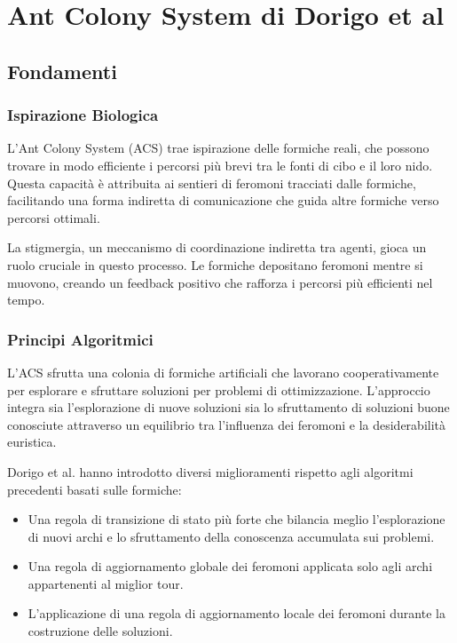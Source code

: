 
%

\chapter{Ant Colony System di Dorigo et al}\label{chapt:5}



\section{Fondamenti}

\subsection{Ispirazione Biologica}
L'Ant Colony System (\Gls{ACS}) trae ispirazione delle formiche reali, che possono trovare in modo efficiente i percorsi più brevi tra le fonti di cibo e il loro nido. Questa capacità è attribuita ai sentieri di feromoni tracciati dalle formiche, facilitando una forma indiretta di comunicazione che guida altre formiche verso percorsi ottimali\cite{Dorigo1996, Dorigo1997}.

La stigmergia, un meccanismo di coordinazione indiretta tra agenti, gioca un ruolo cruciale in questo processo\cite{Bonabeau1999}. Le formiche depositano feromoni mentre si muovono, creando un feedback positivo che rafforza i percorsi più efficienti nel tempo\cite{Deneubourg1990}.

\subsection{Principi Algoritmici}
L'\Gls{ACS} sfrutta una colonia di formiche artificiali che lavorano cooperativamente per esplorare e sfruttare soluzioni per problemi di ottimizzazione. L'approccio integra sia l'esplorazione di nuove soluzioni sia lo sfruttamento di soluzioni buone conosciute attraverso un equilibrio tra l'influenza dei feromoni e la desiderabilità euristica.\cite{Dorigo1996, Dorigo1997}

Dorigo et al. hanno introdotto diversi miglioramenti rispetto agli algoritmi precedenti basati sulle formiche:

\begin{itemize}
	\item Una regola di transizione di stato più forte che bilancia meglio l'esplorazione di nuovi archi e lo sfruttamento della conoscenza accumulata sui problemi.
	\item Una regola di aggiornamento globale dei feromoni applicata solo agli archi appartenenti al miglior tour.
	\item L'applicazione di una regola di aggiornamento locale dei feromoni durante la costruzione delle soluzioni.
\end{itemize}

